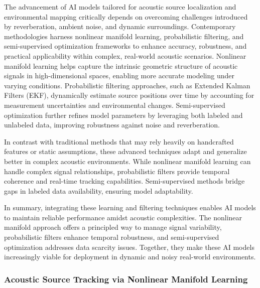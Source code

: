 \documentclass[sigconf]{acmart}
\begin{document}
The advancement of AI models tailored for acoustic source localization and environmental mapping critically depends on overcoming challenges introduced by reverberation, ambient noise, and dynamic surroundings. Contemporary methodologies harness nonlinear manifold learning, probabilistic filtering, and semi-supervised optimization frameworks to enhance accuracy, robustness, and practical applicability within complex, real-world acoustic scenarios. Nonlinear manifold learning helps capture the intrinsic geometric structure of acoustic signals in high-dimensional spaces, enabling more accurate modeling under varying conditions. Probabilistic filtering approaches, such as Extended Kalman Filters (EKF), dynamically estimate source positions over time by accounting for measurement uncertainties and environmental changes. Semi-supervised optimization further refines model parameters by leveraging both labeled and unlabeled data, improving robustness against noise and reverberation.

In contrast with traditional methods that may rely heavily on handcrafted features or static assumptions, these advanced techniques adapt and generalize better in complex acoustic environments. While nonlinear manifold learning can handle complex signal relationships, probabilistic filters provide temporal coherence and real-time tracking capabilities. Semi-supervised methods bridge gaps in labeled data availability, ensuring model adaptability.

In summary, integrating these learning and filtering techniques enables AI models to maintain reliable performance amidst acoustic complexities. The nonlinear manifold approach offers a principled way to manage signal variability, probabilistic filters enhance temporal robustness, and semi-supervised optimization addresses data scarcity issues. Together, they make these AI models increasingly viable for deployment in dynamic and noisy real-world environments.

\subsubsection{Acoustic Source Tracking via Nonlinear Manifold Learning}
\end{document}
